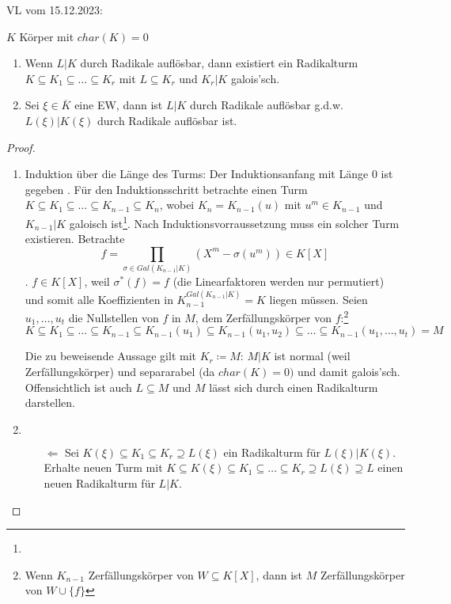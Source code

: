 \documentclass[../main.tex]{subfiles}
\begin{document}
\begin{flushright}
VL vom 15.12.2023:
\end{flushright}
\begin{lemma}\label{theo:3.24}
    $K$ Körper mit $char(K)=0$
    \begin{enumerate}[label=\alph*)]
        \item Wenn $L|K$ durch Radikale auflösbar, dann existiert ein Radikalturm $K\subseteq K_1\subseteq\dots\subseteq K_r$ mit $L\subseteq K_r$ und $K_r|K$ galois'sch.
        \item Sei $\xi \in \overline{K}$  eine EW, dann ist $L|K$ durch Radikale auflösbar g.d.w. $L(\xi)|K(\xi)$ durch Radikale auflösbar ist.
    \end{enumerate}
\end{lemma}
\begin{proof}
    \begin{enumerate}[label=\alph*)]
        \item Induktion über die Länge des Turms:
        Der Induktionsanfang mit Länge $0$ ist gegeben \checkmark.
        Für den Induktionsschritt betrachte einen Turm $K\subseteq K_1\subseteq\dots\subseteq K_{n-1}\subseteq K_n$, wobei $K_n = K_{n-1}(u)$ mit $u^m \in K_{n-1}$ und $K_{n-1}|K$ galoisch ist\footnote{\TODO[Die Index-Arbeit hier ist verwirrend: Wir Konstruieren kein $K_n = K_{n-1}(u)$ sondern nur einen Turm (der auch galois ist), der $K_n$ enthält.]}.
        Nach Induktionsvorraussetzung muss ein solcher Turm existieren.
        Betrachte $$f = \prod_{\sigma\in Gal(K_{n-1}|K)} \left(X^m-\sigma(u^m)\right)\in K[X]$$.
        $f\in K[X]$, weil $\sigma^*(f)=f$ (die Linearfaktoren werden nur permutiert) und somit alle Koeffizienten in $K_{n-1}^{Gal(K_{n-1}|K)}=K$ liegen müssen.
        Seien $u_1,\dots,u_t$ die Nullstellen von $f$ in $M$, dem Zerfällungskörper von $f$:\footnote{Wenn $K_{n-1}$ Zerfällungskörper von $W\subseteq K[X]$, dann ist $M$ Zerfällungskörper von $W\cup \{f\}$}
        $$K\subseteq K_1\subseteq\dots\subseteq K_{n-1}\subseteq K_{n-1}(u_1)\subseteq K_{n-1}(u_1,u_2)\subseteq\dots\subseteq K_{n-1}(u_1,\dots,u_t)=M$$

        Die zu beweisende Aussage gilt mit $K_r\coloneqq M$:
        $M|K$ ist normal (weil Zerfällungskörper) und separarabel (da $char(K)=0)$ und damit galois'sch.
        Offensichtlich ist auch $L\subseteq M$ und $M$ lässt sich durch einen Radikalturm darstellen.
        

        \item $ $
        \begin{itemize}
            \item[$\Leftarrow$] Sei $K(\xi) \subseteq K_1\subseteq K_r\supseteq L(\xi)$ ein Radikalturm für $L(\xi)|K(\xi)$.
            Erhalte neuen Turm mit $K\subseteq K(\xi)\subseteq K_1\subseteq\dots\subseteq K_r \supseteq L(\xi)\supseteq L$ einen neuen Radikalturm für $L|K$.
            

\end{itemize}
\end{enumerate}
\end{proof}
\end{document}

